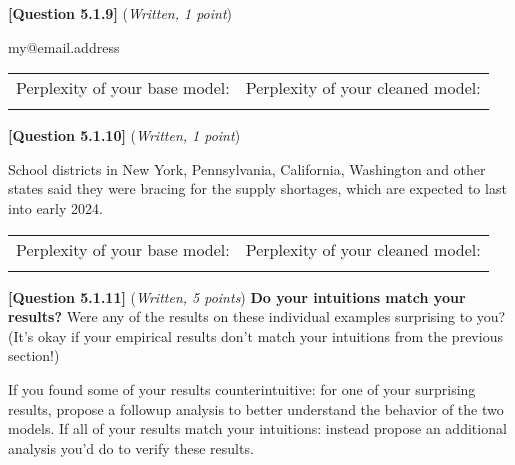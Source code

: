 \documentclass[leqno,12pt]{article}
\begin{document}
\noindent \textbf{[Question 5.1.9]} (\emph{Written, 1 point})
\begin{tcolorbox}[colback=blue!5!white,colframe=blue!75!black]
 my@email.address
 \end{tcolorbox}
 \begin{tabular}{cc}
         Perplexity of your base model:  & Perplexity of your cleaned model: 
 \\
       \begin{tcolorbox}[fit,height=1cm, width=0.4\linewidth, blank, borderline={1pt}{-2pt}]
\end{tcolorbox}  & \begin{tcolorbox}[fit,height=1cm, width=0.4\linewidth, blank, borderline={1pt}{-2pt}]
\end{tcolorbox}
\end{tabular}

\noindent \textbf{[Question 5.1.10]} (\emph{Written, 1 point})
\begin{tcolorbox}[colback=blue!5!white,colframe=blue!75!black]
School districts in New York, Pennsylvania, California, Washington and other states said they were bracing for the supply shortages, which are expected to last into early 2024. \end{tcolorbox} 
\begin{tabular}{cc}
         Perplexity of your base model:  & Perplexity of your cleaned model: 
 \\
       \begin{tcolorbox}[fit,height=1cm, width=0.4\linewidth, blank, borderline={1pt}{-2pt}]
\end{tcolorbox}  & \begin{tcolorbox}[fit,height=1cm, width=0.4\linewidth, blank, borderline={1pt}{-2pt}]
\end{tcolorbox}
\end{tabular}



\noindent \textbf{[Question 5.1.11]} (\emph{Written, 5 points}) \textbf{Do your intuitions match your results?}
Were any of the results on these individual examples surprising to you? (It's okay if your empirical results don't match your intuitions from the previous section!) 

If you found some of your results counterintuitive: for one of your surprising results, propose a followup analysis to better understand the behavior of the two models. 
If all of your results match your intuitions: instead propose an additional analysis you'd do to verify these results.
\end{document}
